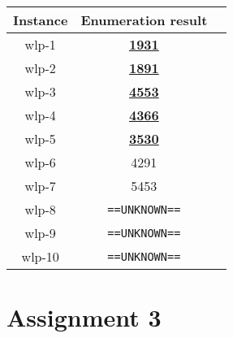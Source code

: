 \documentclass{article}
\newcommand{\UNK}{\texttt{==UNKNOWN==}}
\newcommand{\sol}[1]{#1}
\newcommand{\proved}[1]{\textbf{\underline{#1}}}
\begin{document}
\begin{table}[H]
    \begin{center}
        \begin{tabular}{|c|c|c|}
            \hline
            \textbf{Instance}&\textbf{Enumeration result}  \\
            \hline
            wlp-1         &   \proved{1931} \\
            \hline
            wlp-2         &   \proved{1891} \\
            \hline
            wlp-3         &   \proved{4553} \\
            \hline
            wlp-4         &   \proved{4366} \\
            \hline
            wlp-5         &   \proved{3530} \\
            \hline
            wlp-6         &   \sol{4291}    \\
            \hline
            wlp-7         &   \sol{5453}    \\
            \hline
            wlp-8         &   \UNK          \\
            \hline
            wlp-9         &   \UNK          \\
            \hline
            wlp-10        &   \UNK          \\
            \hline
        \end{tabular}
    \end{center}
\end{table}

\section{Assignment 3}
\end{document}

